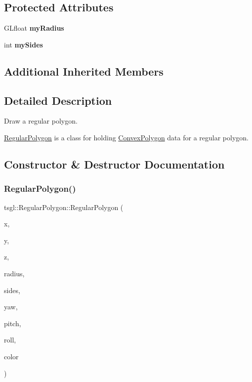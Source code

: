 \subsection*{Protected Attributes}
\begin{DoxyCompactItemize}
\item 
\mbox{\label{classtsgl_1_1_regular_polygon_a11297204087159c74683b7ba92b703b8}} 
G\+Lfloat {\bfseries my\+Radius}
\item 
\mbox{\label{classtsgl_1_1_regular_polygon_af84c48c2e6ff8a6d389e73c4185655b7}} 
int {\bfseries my\+Sides}
\end{DoxyCompactItemize}
\subsection*{Additional Inherited Members}


\subsection{Detailed Description}
Draw a regular polygon. 

\hyperlink{classtsgl_1_1_regular_polygon}{Regular\+Polygon} is a class for holding \hyperlink{classtsgl_1_1_convex_polygon}{Convex\+Polygon} data for a regular polygon. 

\subsection{Constructor \& Destructor Documentation}
\mbox{\label{classtsgl_1_1_regular_polygon_a084a058facd0ce8576c908227c912f72}} 
\subsubsection{\texorpdfstring{Regular\+Polygon()}{RegularPolygon()}\hspace{0.1cm}{\footnotesize\ttfamily [1/2]}}
{\footnotesize\ttfamily tsgl\+::\+Regular\+Polygon\+::\+Regular\+Polygon (\begin{DoxyParamCaption}\item[{float}]{x,  }\item[{float}]{y,  }\item[{float}]{z,  }\item[{G\+Lfloat}]{radius,  }\item[{int}]{sides,  }\item[{float}]{yaw,  }\item[{float}]{pitch,  }\item[{float}]{roll,  }\item[{\hyperlink{structtsgl_1_1_color_float}{Color\+Float}}]{color }\end{DoxyParamCaption})}



